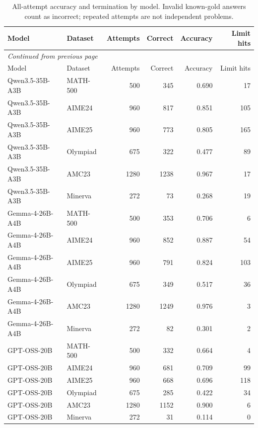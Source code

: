 \begingroup\scriptsize\setlength{\tabcolsep}{4pt}
\begin{longtable}{@{}llrrrr@{}}
\caption{All-attempt accuracy and termination by model. Invalid known-gold answers count as incorrect; repeated attempts are not independent problems.}\label{tab:multi-population}\\
\toprule
Model & Dataset & Attempts & Correct & Accuracy & Limit hits \\
\midrule\endfirsthead
\multicolumn{6}{l}{\textit{Continued from previous page}}\\
\toprule
Model & Dataset & Attempts & Correct & Accuracy & Limit hits \\
\midrule\endhead
\bottomrule\endfoot
Qwen3.5-35B-A3B & MATH-500 & 500 & 345 & 0.690 & 17 \\
Qwen3.5-35B-A3B & AIME24 & 960 & 817 & 0.851 & 105 \\
Qwen3.5-35B-A3B & AIME25 & 960 & 773 & 0.805 & 165 \\
Qwen3.5-35B-A3B & Olympiad & 675 & 322 & 0.477 & 89 \\
Qwen3.5-35B-A3B & AMC23 & 1280 & 1238 & 0.967 & 17 \\
Qwen3.5-35B-A3B & Minerva & 272 & 73 & 0.268 & 19 \\
Gemma-4-26B-A4B & MATH-500 & 500 & 353 & 0.706 & 6 \\
Gemma-4-26B-A4B & AIME24 & 960 & 852 & 0.887 & 54 \\
Gemma-4-26B-A4B & AIME25 & 960 & 791 & 0.824 & 103 \\
Gemma-4-26B-A4B & Olympiad & 675 & 349 & 0.517 & 36 \\
Gemma-4-26B-A4B & AMC23 & 1280 & 1249 & 0.976 & 3 \\
Gemma-4-26B-A4B & Minerva & 272 & 82 & 0.301 & 2 \\
GPT-OSS-20B & MATH-500 & 500 & 332 & 0.664 & 4 \\
GPT-OSS-20B & AIME24 & 960 & 681 & 0.709 & 99 \\
GPT-OSS-20B & AIME25 & 960 & 668 & 0.696 & 118 \\
GPT-OSS-20B & Olympiad & 675 & 285 & 0.422 & 34 \\
GPT-OSS-20B & AMC23 & 1280 & 1152 & 0.900 & 6 \\
GPT-OSS-20B & Minerva & 272 & 31 & 0.114 & 0 \\
\end{longtable}\endgroup

